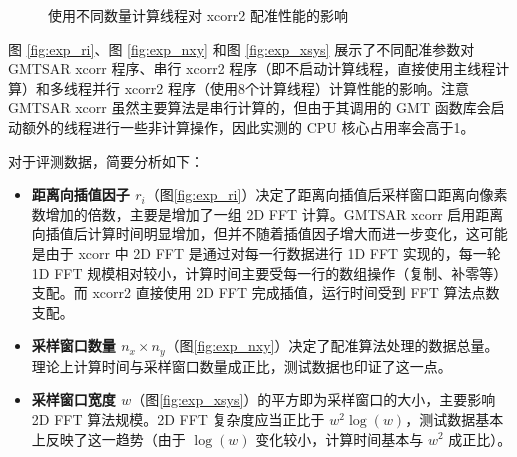 \begin{figure}[htbp]
\centering
\subfloat[程序计算时间]{
    \label{fig:exp_cores_a}
    \begin{minipage}[t]{0.49\textwidth}
        \centering
        \resizebox {\textwidth} {!} {
            
        }
    \end{minipage}
}

\caption{使用不同数量计算线程对 xcorr2 配准性能的影响} \label{fig:exp_cores}
\end{figure}
 
图 \ref{fig:exp_ri}、图 \ref{fig:exp_nxy} 和图 \ref{fig:exp_xsys} 展示了不同配准参数对 GMTSAR xcorr 程序、串行 xcorr2 程序（即不启动计算线程，直接使用主线程计算）和多线程并行 xcorr2 程序（使用8个计算线程）计算性能的影响。注意 GMTSAR xcorr 虽然主要算法是串行计算的，但由于其调用的 GMT 函数库会启动额外的线程进行一些非计算操作，因此实测的 CPU 核心占用率会高于1。

对于评测数据，简要分析如下：
\begin{itemize}
    \item \textbf{距离向插值因子 $r_i$}（图\ref{fig:exp_ri}）决定了距离向插值后采样窗口距离向像素数增加的倍数，主要是增加了一组 2D FFT 计算。GMTSAR xcorr 启用距离向插值后计算时间明显增加，但并不随着插值因子增大而进一步变化，这可能是由于 xcorr 中 2D FFT 是通过对每一行数据进行 1D FFT 实现的，每一轮 1D FFT 规模相对较小，计算时间主要受每一行的数组操作（复制、补零等）支配。而 xcorr2 直接使用 2D FFT 完成插值，运行时间受到 FFT 算法点数支配。
    \item \textbf{采样窗口数量 $n_x \times n_y$}（图\ref{fig:exp_nxy}）决定了配准算法处理的数据总量。理论上计算时间与采样窗口数量成正比，测试数据也印证了这一点。
    \item \textbf{采样窗口宽度 $w$}（图\ref{fig:exp_xsys}）的平方即为采样窗口的大小，主要影响 2D FFT 算法规模。2D FFT 复杂度应当正比于 $w^2 \log(w)$，测试数据基本上反映了这一趋势（由于 $\log(w)$ 变化较小，计算时间基本与 $w^2$ 成正比）。
\end{itemize}

